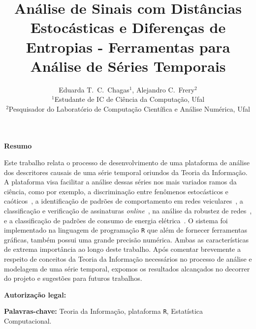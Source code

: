 \documentclass[12pt]{article}
\title{\large \textbf{Análise de Sinais com Distâncias Estocásticas e Diferenças de Entropias - Ferramentas para Análise de Séries Temporais}}
\author{\myfont Eduarda T.\ C.\ Chagas$^{1}$, Alejandro C.\ Frery$^{2}$\\
    \myfont $^{1}$Estudante de IC de Ciência da Computação, Ufal\\
    \myfont $^{2}$Pesquisador do Laboratório de Computação Científica e Análise Numérica, Ufal}
\date{}
\begin{document}
\raggedright
\maketitle
\thispagestyle{empty}
\pagestyle{empty}

\textbf{Resumo}

 	Este trabalho relata o processo de desenvolvimento de uma plataforma de análise dos descritores causais de uma série temporal oriundos da Teoria da Informação.
	A plataforma visa facilitar a análise dessas séries nos mais variados ramos da ciência, como por exemplo, a discriminação entre fenômenos estocásticos e caóticos~\cite{DistinguishingNoiseFromChaos}, a identificação de padrões de comportamento em redes veiculares~\cite{CharacterizationVehicleBehaviorInformationTheory}, a classificação e verificação de assinaturas \textit{online}~\cite{ClassificationVerificationOnlineHandwrittenSignatures}, na análise da robustez de redes~\cite{InformationTheoryPerspectiveNetworkRobustness}, e a classificação de padrões de consumo de energia elétrica~\cite{CharacterizationElectricLoadInformationTheoryQuantifiers}.
O sistema foi implementado na linguagem de programação \texttt R que além de fornecer ferramentas gráficas, também possui uma grande precisão numérica. 
Ambas as características de extrema importância ao longo deste trabalho.
Após comentar brevemente a respeito de conceitos da Teoria da Informação necessários no processo de análise e modelagem de uma série temporal, expomos os resultados alcançados no decorrer do projeto e sugestões para futuros trabalhos.

\textbf{Autorização legal:}

\textbf{Palavras-chave:} Teoria da Informação, plataforma \texttt R, Estatística Computacional.
\end{document}
